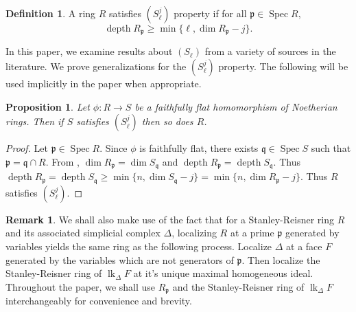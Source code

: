 \documentclass[11pt]{amsart}
\numberwithin{equation}{section}
\newtheorem{prop}[theorem]{Proposition}
\theoremstyle{definition}
\newtheorem{defn}[theorem]{Definition}
\newtheorem{remark}[theorem]{Remark}
\theoremstyle{remark}
\newcommand{\lk}{\operatorname{lk}}
\newcommand{\Spec}{\operatorname{Spec}}
\newcommand{\depth}{\operatorname{depth}}
\begin{document}
\begin{defn}
A ring $R$ satisfies $(S_{\ell}^j)$ property if for all $\mathfrak{p} \in \Spec R,$ \[\depth R_{\mathfrak{p}} \geq \min \{ \ell , \dim R_{\mathfrak{p}} - j \} .\]
\end{defn}

In this paper, we examine results about $(S_\ell)$ from a variety of sources in the literature.  We prove generalizations for the $(S_{\ell}^j)$ property.  The following will be used implicitly in the paper when appropriate.

\begin{prop}
Let $\phi: R \rightarrow S$ be a faithfully flat homomorphism of Noetherian rings.  Then if $S$ satisfies $(S_\ell^j)$ then so does $R$.
\end{prop}

\begin{proof}
Let $\mathfrak{p} \in \Spec R$.  Since $\phi$ is faithfully flat, there exists $\mathfrak{q} \in \Spec S$ such that $\mathfrak{p} = \mathfrak{q} \cap R$.  From \cite{BH98}, $\dim R_{\mathfrak{p}}=\dim S_{\mathfrak{q}}$ and $\depth R_{\mathfrak{p}}=\depth S_{\mathfrak{q}}$.  Thus $\depth R_{\mathfrak{p}} = \depth S_{\mathfrak{q}} \geq \min \{ n,\dim S_{\mathfrak{q}} - j \} = \min \{ n,\dim R_{\mathfrak{p}}-j \}$.  Thus $R$ satisfies $(S_\ell^j)$.
\end{proof}

\begin{remark}
We shall also make use of the fact that for a Stanley-Reisner ring $R$ and its associated simplicial complex $\Delta$, localizing $R$ at a prime $\mathfrak{p}$ generated by variables yields the same ring as the following process.  Localize $\Delta$ at a face $F$ generated by the variables which are not generators of $\mathfrak{p}$.  Then localize the Stanley-Reisner ring of $\lk _\Delta F$ at it's unique maximal homogeneous ideal.  Throughout the paper, we shall use $R_\mathfrak{p}$ and the Stanley-Reisner ring of $\lk_\Delta F$ interchangeably for convenience and brevity.
\end{remark}


\end{document}
